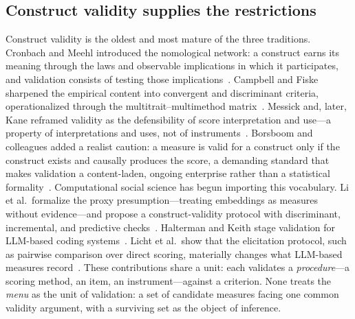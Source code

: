 \documentclass[10pt,letterpaper]{article}
\begin{document}
\subsection{Construct validity supplies the restrictions}
Construct validity is the oldest and most mature of the three traditions.
Cronbach and Meehl introduced the nomological network: a construct earns its meaning through the laws and observable implications in which it participates, and validation consists of testing those implications~\cite{cronbach1955}.
Campbell and Fiske sharpened the empirical content into convergent and discriminant criteria, operationalized through the multitrait--multimethod matrix~\cite{campbell1959}.
Messick and, later, Kane reframed validity as the defensibility of score interpretation and use---a property of interpretations and uses, not of instruments~\cite{messick1995,kane2013}.
Borsboom and colleagues added a realist caution: a measure is valid for a construct only if the construct exists and causally produces the score, a demanding standard that makes validation a content-laden, ongoing enterprise rather than a statistical formality~\cite{borsboom2004}.
Computational social science has begun importing this vocabulary.
Li et al.~formalize the proxy presumption---treating embeddings as measures without evidence---and propose a construct-validity protocol with discriminant, incremental, and predictive checks~\cite{proxy2026}.
Halterman and Keith stage validation for LLM-based coding systems~\cite{halterman2026}.
Licht et al.~show that the elicitation protocol, such as pairwise comparison over direct scoring, materially changes what LLM-based measures record~\cite{licht2025}.
These contributions share a unit: each validates a \emph{procedure}---a scoring method, an item, an instrument---against a criterion.
None treats the \emph{menu} as the unit of validation: a set of candidate measures facing one common validity argument, with a surviving set as the object of inference.
\end{document}
